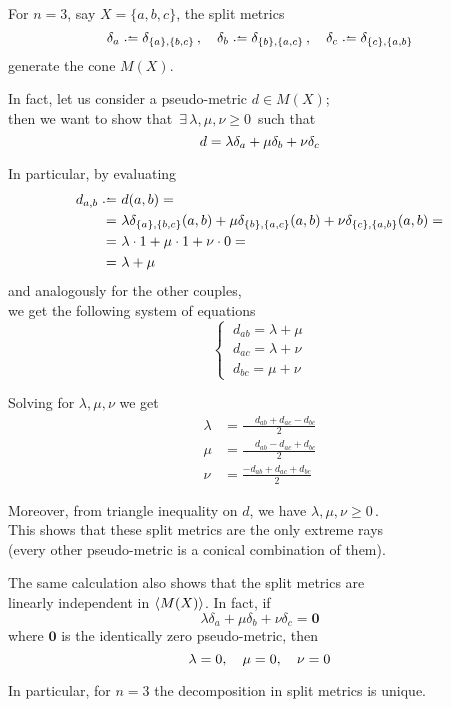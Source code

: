 \documentclass[./main.tex]{subfiles}
\begin{document}
\begin{remark}
    For $n = 3$, say $X = \{a,b,c\}$, the split metrics
    \[ \delta_a \defeq \delta_{\{a\},\{b,c\}} \,, \quad \delta_b \defeq \delta_{\{b\},\{a,c\}} \,, \quad \delta_c \defeq \delta_{\{c\},\{a,b\}} \]
    generate the cone $M(X)$.\bigskip

    In fact, let us consider a pseudo-metric $d \in M(X)$; \\
    then we want to show that $\, \exists\, \lambda, \mu, \nu \geq 0 \,$ such that
    \[ d = \lambda \delta_a + \mu \delta_b + \nu \delta_c \nospblw \]

    In particular, by evaluating
    \begin{align*}
        d_{a,b} \defeq&\ d(a,b) = \\
                =&\ \lambda \delta_{\{a\},\{b,c\}}(a,b) + \mu \delta_{\{b\},\{a,c\}}(a,b) + \nu \delta_{\{c\},\{a,b\}}(a,b) = \\
                =&\ \lambda \cdot 1 + \mu \cdot 1 + \nu \cdot 0 = \\
                =&\ \lambda + \mu
    \end{align*}
    and analogously for the other couples, \\
    we get the following system of equations
    \[ \begin{cases}
        \ d_{ab} = \lambda + \mu \\
        \ d_{ac} = \lambda + \nu \\
        \ d_{bc} = \mu + \nu
        \end{cases} \]

    Solving for $\lambda, \mu, \nu$ we get
    \begin{align*}
        \lambda &= \frac{\phantom{-} d_{ab} + d_{ac} - d_{bc}}{2} \\[5pt]
        \mu     &= \frac{\phantom{-} d_{ab} - d_{ac} + d_{bc}}{2} \\[5pt]
        \nu     &= \frac{- d_{ab} + d_{ac} + d_{bc}}{2}
    \end{align*}

    Moreover, from triangle inequality on $d$, we have $\lambda, \mu, \nu \geq 0 \,$. \\
    This shows that these split metrics are the only extreme rays \\
    (every other pseudo-metric is a conical combination of them).

    The same calculation also shows that the split metrics are \\
    linearly independent in $\left\langle M(X)\right\rangle$. In fact, if
    \[ \lambda \delta_a + \mu \delta_b + \nu \delta_c = \bm{0} \]
    where $\bm{0}$ is the identically zero pseudo-metric, then
    \[ \lambda = 0, \quad \mu = 0, \quad \nu = 0 \nospblw \]

    In particular, for $n = 3$ the decomposition in split metrics is unique.
\end{remark}
\end{document}
